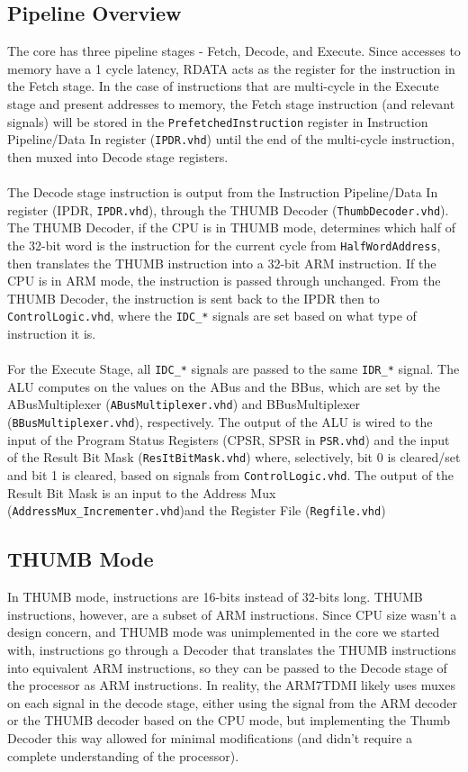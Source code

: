 \documentclass[11pt,a4paper]{article}
\begin{document}
	\subsection{Pipeline Overview}
	The core has three pipeline stages - Fetch, Decode, and Execute. Since accesses to memory have a 1 cycle latency, RDATA acts as the register for the instruction in the Fetch stage. In the case of instructions that are multi-cycle in the Execute stage and present addresses to memory, the Fetch stage instruction (and relevant signals) will be stored in the \texttt{PrefetchedInstruction} register in Instruction Pipeline/Data In register (\texttt{IPDR.vhd}) until the end of the multi-cycle instruction, then muxed into Decode stage registers.\\\\
	The Decode stage instruction is output from the Instruction Pipeline/Data In register (IPDR, \texttt{IPDR.vhd}), through the THUMB Decoder (\texttt{ThumbDecoder.vhd}). The THUMB Decoder, if the CPU is in THUMB mode, determines which half of the 32-bit word is the instruction for the current cycle from \texttt{HalfWordAddress}, then translates the THUMB instruction into a 32-bit ARM instruction. If the CPU is in ARM mode, the instruction is passed through unchanged. From the THUMB Decoder, the instruction is sent back to the IPDR then to \texttt{ControlLogic.vhd}, where the \texttt{IDC\_*} signals are set based on what type of instruction it is.\\\\
	For the Execute Stage, all \texttt{IDC\_*} signals are passed to the same \texttt{IDR\_*} signal. The ALU computes on the values on the ABus and the BBus, which are set by the ABusMultiplexer (\texttt{ABusMultiplexer.vhd}) and BBusMultiplexer (\texttt{BBusMultiplexer.vhd}), respectively. The output of the ALU is wired to the input of the Program Status Registers (CPSR, SPSR in \texttt{PSR.vhd}) and the input of the Result Bit Mask (\texttt{ResItBitMask.vhd}) where, selectively, bit 0 is cleared/set and bit 1 is cleared, based on signals from \texttt{ControlLogic.vhd}. The output of the Result Bit Mask is an input to the Address Mux (\texttt{AddressMux\_Incrementer.vhd})and the Register File (\texttt{Regfile.vhd})
	
	\subsection{THUMB Mode}
	In THUMB mode, instructions are 16-bits instead of 32-bits long. THUMB instructions, however, are a subset of ARM instructions. Since CPU size wasn't a design concern, and THUMB mode was unimplemented in the core we started with, instructions go through a Decoder that translates the THUMB instructions into equivalent ARM instructions, so they can be passed to the Decode stage of the processor as ARM instructions. In reality, the ARM7TDMI likely uses muxes on each signal in the decode stage, either using the signal from the ARM decoder or the THUMB decoder based on the CPU mode, but implementing the Thumb Decoder this way allowed for minimal modifications (and didn't require a complete understanding of the processor).
	
\end{document}
